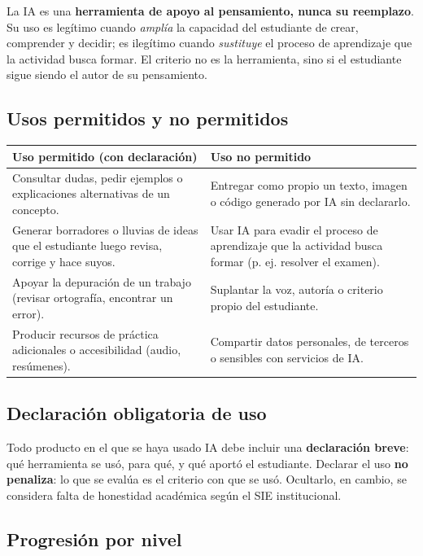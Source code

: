 \documentclass[12pt, a4paper]{article}
\begin{document}
La IA es una \textbf{herramienta de apoyo al pensamiento, nunca su reemplazo}.
Su uso es legítimo cuando \emph{amplía} la capacidad del estudiante de crear,
comprender y decidir; es ilegítimo cuando \emph{sustituye} el proceso de
aprendizaje que la actividad busca formar. El criterio no es la herramienta, sino
si el estudiante sigue siendo el autor de su pensamiento.

\subsection{Usos permitidos y no permitidos}

\begin{center}
\begin{tabular}{|L{6.8cm}|L{6.8cm}|}
\hline
{}
\color{white}\textbf{Uso permitido (con declaración)} &
\color{white}\textbf{Uso no permitido} \\
\hline
Consultar dudas, pedir ejemplos o explicaciones alternativas de un concepto. &
Entregar como propio un texto, imagen o código generado por IA sin declararlo. \\
\hline
Generar borradores o lluvias de ideas que el estudiante luego revisa, corrige y
hace suyos. &
Usar IA para evadir el proceso de aprendizaje que la actividad busca formar
(p. ej. resolver el examen). \\
\hline
Apoyar la depuración de un trabajo (revisar ortografía, encontrar un error). &
Suplantar la voz, autoría o criterio propio del estudiante. \\
\hline
Producir recursos de práctica adicionales o accesibilidad (audio, resúmenes). &
Compartir datos personales, de terceros o sensibles con servicios de IA. \\
\hline
\end{tabular}
\end{center}

\subsection{Declaración obligatoria de uso}

Todo producto en el que se haya usado IA debe incluir una \textbf{declaración
breve}: qué herramienta se usó, para qué, y qué aportó el estudiante. Declarar el
uso \textbf{no penaliza}: lo que se evalúa es el criterio con que se usó. Ocultarlo,
en cambio, se considera falta de honestidad académica según el SIE institucional.

\subsection{Progresión por nivel}
\end{document}
